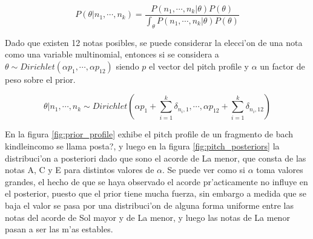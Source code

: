 $$P(\theta|n_1, \cdots, n_k) = \frac{P(n_1,\cdots, n_k | \theta) P(\theta)}{\int_{\theta}P(n_1, \cdots, n_k | \theta) P(\theta)}$$

Dado que existen 12 notas posibles, se puede considerar la elecci'on de una nota como una variable multinomial, entonces 
si se considera a $\theta \sim Dirichlet(\alpha p_1, \cdots, \alpha p_{12})$ siendo $p$ el vector del pitch profile y $\alpha$ un factor de peso sobre el prior.

$$\theta | n_1, \cdots, n_k \sim Dirichlet(\alpha p_1 + \sum_{i=1}^k \delta_{n_i,1}, \cdots, \alpha p_{12} + \sum_{i=1}^k \delta_{n_i,12})$$

En la figura \ref{fig:prior_profile} exhibe el pitch profile de un fragmento de bach kindlein\alert{como se llama posta?}, y luego en la figura \ref{fig:pitch_posteriors}
la distribuci'on a posteriori dado que sono el acorde de La menor, que consta de las notas A, C y E para distintos valores de $\alpha$. 
Se puede ver como si $\alpha$ toma valores grandes, el hecho
de que se haya observado el acorde pr'acticamente no influye en el posterior, puesto que el prior tiene mucha fuerza, sin embargo a medida que se baja el valor se pasa por una 
distribuci'on de alguna forma uniforme entre las notas del acorde de Sol mayor y de La menor, y luego las notas de La menor pasan a ser las m'as estables.

\begin{imagen}
    \width{10cm}
\end{imagen}


